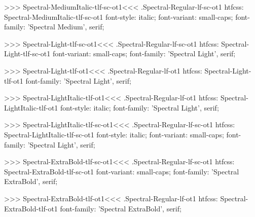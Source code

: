 >>>
\<Spectral-MediumItalic-tlf-sc-ot1\><<<
.Spectral-Regular-lf-sc-ot1
htfcss:  Spectral-MediumItalic-tlf-sc-ot1  font-style: italic; font-variant: small-caps; font-family: 'Spectral Medium', serif;

>>>
\<Spectral-Light-tlf-sc-ot1\><<<
.Spectral-Regular-lf-sc-ot1
htfcss:  Spectral-Light-tlf-sc-ot1  font-variant: small-caps; font-family: 'Spectral Light', serif;

>>>
\<Spectral-Light-tlf-ot1\><<<
.Spectral-Regular-lf-ot1
htfcss:  Spectral-Light-tlf-ot1  font-family: 'Spectral Light', serif;

>>>
\<Spectral-LightItalic-tlf-ot1\><<<
.Spectral-Regular-lf-ot1
htfcss:  Spectral-LightItalic-tlf-ot1  font-style: italic; font-family: 'Spectral Light', serif;

>>>
\<Spectral-LightItalic-tlf-sc-ot1\><<<
.Spectral-Regular-lf-sc-ot1
htfcss:  Spectral-LightItalic-tlf-sc-ot1  font-style: italic; font-variant: small-caps; font-family: 'Spectral Light', serif;

>>>
\<Spectral-ExtraBold-tlf-sc-ot1\><<<
.Spectral-Regular-lf-sc-ot1
htfcss:  Spectral-ExtraBold-tlf-sc-ot1  font-variant: small-caps; font-family: 'Spectral ExtraBold', serif;

>>>
\<Spectral-ExtraBold-tlf-ot1\><<<
.Spectral-Regular-lf-ot1
htfcss:  Spectral-ExtraBold-tlf-ot1  font-family: 'Spectral ExtraBold', serif;

